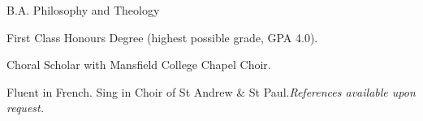 \documentclass{edelgas-resume}
\begin{document}

\begin{position}{B.A. Philosophy and Theology}{}
\item First Class Honours Degree (highest possible grade, GPA 4.0).
\item Choral Scholar with Mansfield College Chapel Choir.
\end{position}

\vspace{-1em}
Fluent in French. Sing in Choir of St Andrew \& St Paul.\hfill{\itshape{References available upon request.}}
\end{document}
